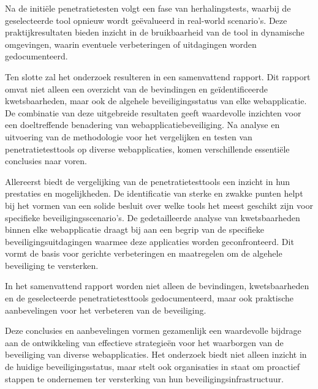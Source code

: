 Na de initiële penetratietesten volgt een fase
van herhalingstests, waarbij de geselecteerde tool
opnieuw wordt geëvalueerd in real-world scenario's.
Deze praktijkresultaten bieden inzicht in de
bruikbaarheid van de tool in dynamische omgevingen,
waarin eventuele verbeteringen of uitdagingen
worden gedocumenteerd.

Ten slotte zal het onderzoek resulteren in een
samenvattend rapport. Dit rapport omvat niet
alleen een overzicht van de bevindingen en geïdentificeerde
kwetsbaarheden, maar ook de algehele
beveiligingsstatus van elke webapplicatie.
De combinatie van deze uitgebreide resultaten
geeft waardevolle inzichten voor een doeltreffende
benadering van webapplicatiebeveiliging.
Na analyse en uitvoering van de methodologie
voor het vergelijken en testen van penetratietesttools
op diverse webapplicaties, komen verschillende
essentiële conclusies naar voren.

Allereerst biedt de vergelijking van de penetratietesttools
een inzicht in hun prestaties en
mogelijkheden. De identificatie van sterke en
zwakke punten helpt bij het vormen van een solide
besluit over welke tools het meest geschikt
zijn voor specifieke beveiligingsscenario's.
De gedetailleerde analyse van kwetsbaarheden
binnen elke webapplicatie draagt bij aan een
begrip van de specifieke beveiligingsuitdagingen
waarmee deze applicaties worden geconfronteerd.
Dit vormt de basis voor gerichte verbeteringen en
maatregelen om de algehele beveiliging te versterken.

In het samenvattend rapport worden niet alleen
de bevindingen, kwetsbaarheden en de geselecteerde
penetratietesttools gedocumenteerd,
maar ook praktische aanbevelingen voor het verbeteren
van de beveiliging. 

Deze conclusies en
aanbevelingen vormen gezamenlijk een waardevolle
bijdrage aan de ontwikkeling van effectieve
strategieën voor het waarborgen van de beveiliging
van diverse webapplicaties. Het onderzoek
biedt niet alleen inzicht in de huidige beveiligingsstatus,
maar stelt ook organisaties in staat
om proactief stappen te ondernemen ter versterking
van hun beveiligingsinfrastructuur.